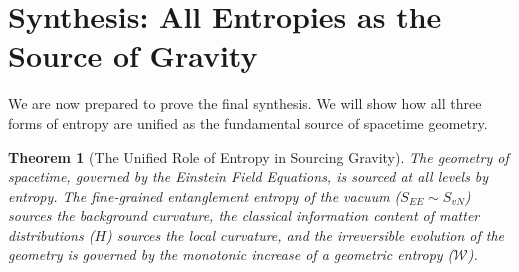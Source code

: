 \documentclass[11pt, letterpaper]{report}
\theoremstyle{plain} %
\newtheorem{theorem}{Theorem}[chapter]
\theoremstyle{definition} %
\theoremstyle{remark} %
\begin{document}
\section{Synthesis: All Entropies as the Source of Gravity}
\label{app:all_entropy_gravity}

We are now prepared to prove the final synthesis. We will show how all three forms of entropy are unified as the fundamental source of spacetime geometry.

\begin{theorem}[The Unified Role of Entropy in Sourcing Gravity]
\label{thm:unified_entropy_source}
The geometry of spacetime, governed by the Einstein Field Equations, is sourced at all levels by entropy. The fine-grained entanglement entropy of the vacuum ($S_{EE} \sim S_{vN}$) sources the background curvature, the classical information content of matter distributions ($H$) sources the local curvature, and the irreversible evolution of the geometry is governed by the monotonic increase of a geometric entropy ($\mathcal{W}$).
\end{theorem}
\end{document}
